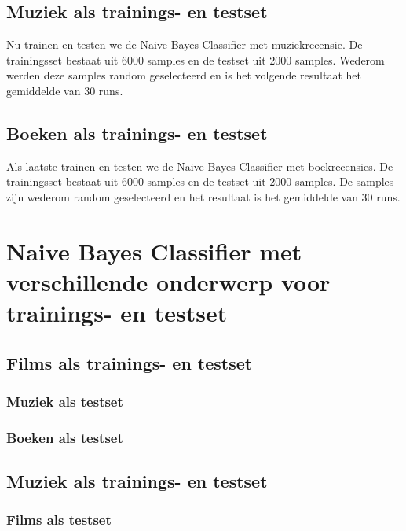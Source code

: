 \subsection{Muziek als trainings- en testset}\label{Muziek als trainings- en testset}

Nu trainen en testen we de Naive Bayes Classifier met muziekrecensie. De trainingsset bestaat uit 6000 samples en de testset uit 2000 samples. Wederom werden deze samples random geselecteerd en is het volgende resultaat het gemiddelde van 30 runs.


\subsection{Boeken als trainings- en testset}\label{Boeken als trainings- en testset}

Als laatste trainen en testen we de Naive Bayes Classifier met boekrecensies. De trainingsset bestaat uit 6000 samples en de testset uit 2000 samples. De samples zijn wederom random geselecteerd en het resultaat is het gemiddelde van 30 runs.



\section{Naive Bayes Classifier met verschillende onderwerp voor trainings- en testset}\label{Naive Bayes Classifier met verschillend onderwerp voor trainings- en testset}

\subsection{Films als trainings- en testset}\label{Films als trainingsset}
\subsubsection{Muziek als testset}\label{Muziek als testset}
\subsubsection{Boeken als testset}\label{Boeken testset}
\subsection{Muziek als trainings- en testset}\label{Muziek als trainingsset}
\subsubsection{Films als testset}\label{Films als testset}
